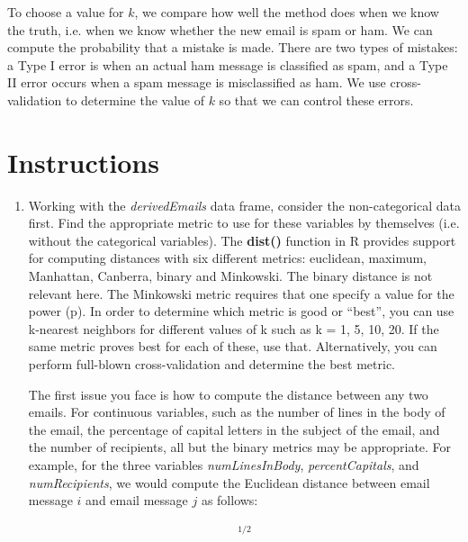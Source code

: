 \documentclass{article}
\def\SFunc#1{\textbf{#1()}}
\def\Svar#1{\textsl{#1}}
\begin{document}
To choose a value for $k$, we 
compare how well the method does when we know the truth,
i.e. when we know whether the new email is spam or ham.
We can compute the probability that a mistake is made.
There are two types of mistakes: a Type I error is when
an actual ham message is classified as spam, and a Type II
error occurs when a spam message is misclassified as ham.
We use cross-validation to determine the value of $k$ so that we
can control these errors. 


\section{Instructions}

\begin{enumerate}
\item Working with the \Svar{derivedEmails} data frame, consider the
  non-categorical data first.  Find the appropriate metric to use for
  these variables by themselves (i.e. without the categorical variables).
  The \SFunc{dist} function in R
  provides support for computing distances with six different metrics:
   euclidean, maximum, Manhattan, Canberra, binary
  and Minkowski.  The binary distance is not relevant here.
  The Minkowski metric requires that one specify a value for the power
  (p).  In order to determine which metric is good or ``best'', you
  can use k-nearest neighbors for different values of k such as k = 1,
  5, 10, 20.  If the same metric proves best for each of these, use
  that.  Alternatively, you can perform full-blown cross-validation
  and determine the best metric.


  The first issue you face is how to compute the distance between any
  two emails.  For continuous variables, such as the number of lines
  in the body of the email, the percentage of capital letters in the
  subject of the email, and the number of recipients, all but the
  binary metrics may be appropriate.  For example, for the  three variables
  \Svar{numLinesInBody}, \Svar{percentCapitals}, and \Svar{numRecipients}, we would compute
  the Euclidean distance between email message $i$ and email message $j$ as follows:

\begin{eqnarray*}
 [(numLinesInBody_i &-& numLinesInBody_j)^2 \\
   &+& (percentCapitals_i - percentCapitals_j)^2\\
     &+& (numRecipients_i - numRecipients_j)^2 ]^{1/2} 
\end{eqnarray*}


\end{enumerate}
\end{document}
